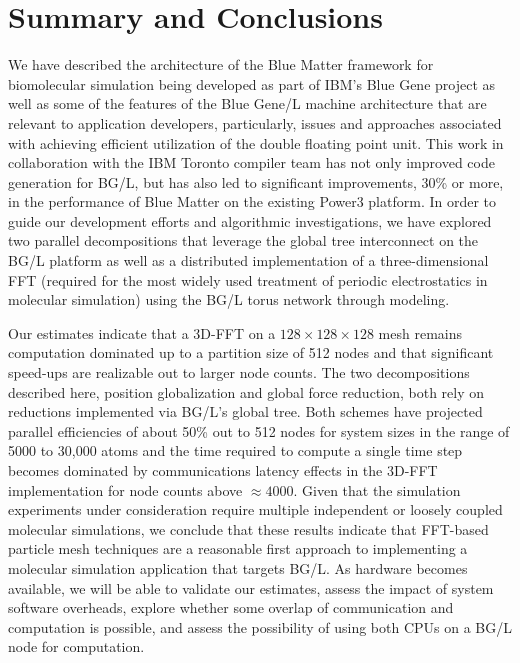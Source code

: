 \documentclass[doublespacing]{elsart}
\begin{document}
\section{Summary and Conclusions}

We have described the architecture of the Blue Matter framework for
biomolecular simulation being developed as part of IBM's Blue Gene
project as well as some of the features of the Blue Gene/L machine
architecture that are relevant to application developers,
particularly, issues and approaches associated with achieving
efficient utilization of the double floating point unit.  This work in
collaboration with the IBM Toronto compiler team has not only improved
code generation for BG/L, but has also led to significant
improvements, 30\% or more, in the performance of Blue Matter on the
existing Power3 platform.  In order to guide our development efforts
and algorithmic investigations, we have explored two parallel
decompositions that leverage the global tree interconnect on the BG/L
platform as well as a distributed implementation of a
three-dimensional FFT (required for the most widely used treatment of
periodic electrostatics in molecular simulation) using the BG/L torus
network through modeling.

Our estimates indicate that a 3D-FFT on a $128\times 128\times 128$
mesh remains computation dominated up to a partition size of 512 nodes
and that significant speed-ups are realizable out to larger node
counts.  The two decompositions described here, position globalization
and global force reduction, both rely on reductions implemented via
BG/L's global tree.  Both schemes have projected parallel efficiencies
of about 50\% out to 512 nodes for system sizes in the range of 5000
to 30,000 atoms and the time required to compute a single time step
becomes dominated by communications latency effects in the 3D-FFT
implementation for node counts above $\approx 4000$.  Given that the
simulation experiments under consideration require multiple
independent or loosely coupled molecular simulations, we conclude that
these results indicate that FFT-based particle mesh techniques are a
reasonable first approach to implementing a molecular simulation
application that targets BG/L.  As hardware becomes available, we will
be able to validate our estimates, assess the impact of system
software overheads, explore whether some overlap of communication and
computation is possible, and assess the possibility of using both CPUs
on a BG/L node for computation.







\end{document}

